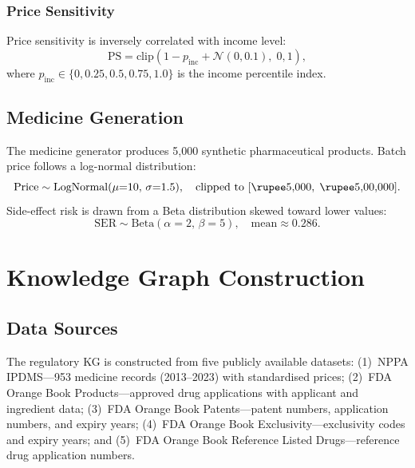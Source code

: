\documentclass[10pt,journal,compsoc]{IEEEtran}
\begin{document}
\subsubsection{Price Sensitivity}

Price sensitivity is inversely correlated with income level:
\begin{equation}
  \text{PS} = \mathrm{clip}\!\left(1 - p_{\text{inc}} + \mathcal{N}(0,0.1),\;0,1\right),
  \label{eq:price_sens}
\end{equation}
where $p_{\text{inc}}\in\{0,0.25,0.5,0.75,1.0\}$ is the income percentile index.

\subsection{Medicine Generation}

The medicine generator produces 5{,}000 synthetic pharmaceutical products.
Batch price follows a log-normal distribution:
\begin{equation}
  \text{Price} \sim \mathrm{LogNormal}(\mu{=}10,\,\sigma{=}1.5),
  \quad \text{clipped to }[\text{\rupee}5{,}000,\;\text{\rupee}5{,}00{,}000].
  \label{eq:price_dist}
\end{equation}
Side-effect risk is drawn from a Beta distribution skewed toward lower values:
\begin{equation}
  \text{SER} \sim \mathrm{Beta}(\alpha{=}2,\,\beta{=}5),
  \quad \text{mean}\approx 0.286.
  \label{eq:ser_dist}
\end{equation}

\section{Knowledge Graph Construction}
\label{sec:kg}

\subsection{Data Sources}

The regulatory KG is constructed from five publicly available datasets:
(1)~NPPA IPDMS---953 medicine records (2013--2023) with standardised prices;
(2)~FDA Orange Book Products---approved drug applications with applicant and ingredient
data;
(3)~FDA Orange Book Patents---patent numbers, application numbers, and expiry years;
(4)~FDA Orange Book Exclusivity---exclusivity codes and expiry years; and
(5)~FDA Orange Book Reference Listed Drugs---reference drug application numbers.
\end{document}
